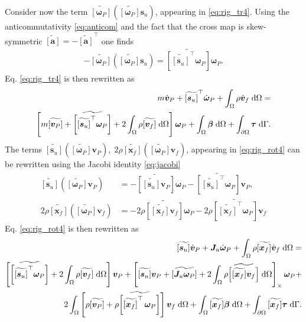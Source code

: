 \documentclass{svjour3}                     %
\newcommand{\crmat}[1]{\ensuremath{\widetilde{\left[#1\right]}}}
\begin{document}
Consider now the term $\crmat{\bm{\omega}_P} (\crmat{\bm{\omega}_P} \bm{s}_u)$, appearing in \eqref{eq:rig_tr4}. Using the anticommutativity \eqref{eq:anticom} and the fact that the cross map is skew-symmetric $\crmat{\bm{a}} = -\crmat{\bm{a}}^\top$ one finds
\begin{align*}
-\crmat{\bm{\omega}_P} (\crmat{\bm{\omega}_P} \bm{s}_u) = \crmat{\crmat{\bm{s}_u}^\top\bm{\omega}_{P}} \bm{\omega}_{P}.
\end{align*}
Eq. \eqref{eq:rig_tr4} is then rewritten as
\begin{equation}
\label{eq:rig_tr5}
\begin{split}
m\dot{\bm{v}}_P + \crmat{\bm{s}_u}^\top \dot{\bm{\omega}}_P +   \int_{\Omega} \rho \dot{\bm{v}}_f \d{\Omega}  = \\
\left[m \crmat{\bm{v}_P} + \crmat{\crmat{\bm{s}_u}^\top \bm\omega_P} +2 \int_{\Omega} \rho \crmat{\bm{v}_f} \d{\Omega} \right] \bm\omega_P +  \int_{\Omega} \bm\beta \d{\Omega} + \int_{\partial \Omega} \bm\tau \d{\Gamma}.
\end{split}
\end{equation}
The terms $\crmat{\bm{s}_u} (\crmat{\bm{\omega}_P} \bm{v}_P), \; 2\rho \crmat{\bm{x}_f} (\crmat{\bm\omega_P} {\bm{v}}_f)$, appearing in \eqref{eq:rig_rot4} can be rewritten using the Jacobi identity \eqref{eq:jacobi}
\begin{align}
\crmat{\bm{s}_u} (\crmat{\bm{\omega}_P} \bm{v}_P) &= - \crmat{\crmat{\bm{s}_u} \bm{v}_P} \bm{\omega}_P - \crmat{\crmat{\bm{s}_u}^\top \bm{\omega}_P} \bm{v}_P, \\
2\rho \crmat{\bm{x}_f} (\crmat{\bm\omega_P} {\bm{v}}_f) &= - 2\rho \crmat{\crmat{\bm{x}_f} \bm{v}_f}\bm\omega_P - 2\rho \crmat{\crmat{\bm{x}_f}^\top \bm\omega_P} \bm{v}_f
\end{align}
Eq. \eqref{eq:rig_rot4} is then rewritten as
\begin{equation}
\label{eq:rig_rot5}
\begin{split}
\crmat{\bm{s}_u} \dot{\bm{v}}_P  + \bm{J}_u \dot{\bm\omega}_P + \int_{\Omega} \rho \crmat{\bm{x}_f} \dot{\bm{v}}_f \d{\Omega} = \\
\left[\crmat{\crmat{\bm{s}_u}^\top \bm\omega_P} + 2 \int_{\Omega} \rho \crmat{\bm{v}_f} \d{\Omega} \right] \bm{v}_P + \left[\crmat{\bm{s}_u} \bm{v}_P + \crmat{\bm{J}_u \bm\omega_P} + 2 \int_{\Omega} \rho \crmat{\crmat{\bm{x}_f} {\bm{v}}_f} \d{\Omega} \right]_\times \bm\omega_P + 
\\
2 \int_{\Omega} \left[\rho \crmat{\bm{v}_P} + \rho \crmat{\crmat{\bm{x}_f}^\top \, \bm\omega_P} \right] \bm{v}_f \d{\Omega} + \int_{\Omega}\crmat{\bm{x}_f} \bm\beta \d{\Omega} + \int_{\partial \Omega}\crmat{\bm{x}_f} \bm{\tau} \d{\Gamma}.
\end{split}
\end{equation}
\end{document}
